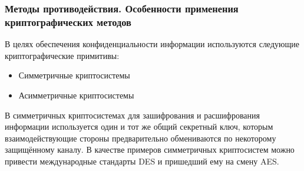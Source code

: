 %

\subsubsection{Методы противодействия. Особенности применения криптографических методов}
В целях обеспечения конфиденциальности информации используются следующие криптографические примитивы:
\begin{itemize}
    \item Симметричные криптосистемы
    \item Асимметричные криптосистемы
\end{itemize}

В симметричных криптосистемах для зашифрования и расшифрования информации используется один и тот же общий секретный ключ, которым взаимодействующие стороны предварительно обмениваются по некоторому защищённому каналу. В качестве примеров симметричных криптосистем можно привести международные стандарты DES и пришедший ему на смену AES.

